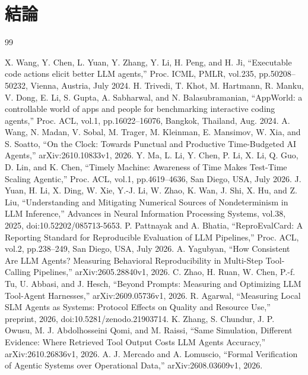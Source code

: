 \documentclass[uplatex,a4paper,twocolumn,10pt]{jsarticle}
\begin{document}
\section{結論}


\begin{thebibliography}{99}
\raggedright
{} X. Wang, Y. Chen, L. Yuan, Y. Zhang, Y. Li, H. Peng, and H. Ji, ``Executable code actions elicit better LLM agents,'' Proc. ICML, PMLR, vol.235, pp.50208--50232, Vienna, Austria, July 2024.
 H. Trivedi, T. Khot, M. Hartmann, R. Manku, V. Dong, E. Li, S. Gupta, A. Sabharwal, and N. Balasubramanian, ``AppWorld: a controllable world of apps and people for benchmarking interactive coding agents,'' Proc. ACL, vol.1, pp.16022--16076, Bangkok, Thailand, Aug. 2024.
 A. Wang, N. Madan, V. Sobal, M. Trager, M. Kleinman, E. Mansimov, W. Xia, and S. Soatto, ``On the Clock: Towards Punctual and Productive Time-Budgeted AI Agents,'' arXiv:2610.10833v1, 2026.
 Y. Ma, L. Li, Y. Chen, P. Li, X. Li, Q. Guo, D. Lin, and K. Chen, ``Timely Machine: Awareness of Time Makes Test-Time Scaling Agentic,'' Proc. ACL, vol.1, pp.4619--4636, San Diego, USA, July 2026.
 J. Yuan, H. Li, X. Ding, W. Xie, Y.-J. Li, W. Zhao, K. Wan, J. Shi, X. Hu, and Z. Liu, ``Understanding and Mitigating Numerical Sources of Nondeterminism in LLM Inference,'' Advances in Neural Information Processing Systems, vol.38, 2025, doi:10.52202/085713-5653.
 P. Pattnayak and A. Bhatia, ``ReproEvalCard: A Reporting Standard for Reproducible Evaluation of LLM Pipelines,'' Proc. ACL, vol.2, pp.238--249, San Diego, USA, July 2026.
 A. Yagubyan, ``How Consistent Are LLM Agents? Measuring Behavioral Reproducibility in Multi-Step Tool-Calling Pipelines,'' arXiv:2605.28840v1, 2026.
 C. Zhao, H. Ruan, W. Chen, P.-f. Tu, U. Abbasi, and J. Hesch, ``Beyond Prompts: Measuring and Optimizing LLM Tool-Agent Harnesses,'' arXiv:2609.05736v1, 2026.
 R. Agarwal, ``Measuring Local SLM Agents as Systems: Protocol Effects on Quality and Resource Use,'' preprint, 2026, doi:10.5281/zenodo.21903714.
 K. Zhang, S. Chundur, J. P. Owusu, M. J. Abdolhosseini Qomi, and M. Raissi, ``Same Simulation, Different Evidence: Where Retrieved Tool Output Costs LLM Agents Accuracy,'' arXiv:2610.26836v1, 2026.
 A. J. Mercado and A. Lomuscio, ``Formal Verification of Agentic Systems over Operational Data,'' arXiv:2608.03609v1, 2026.

\end{thebibliography}
\end{document}

